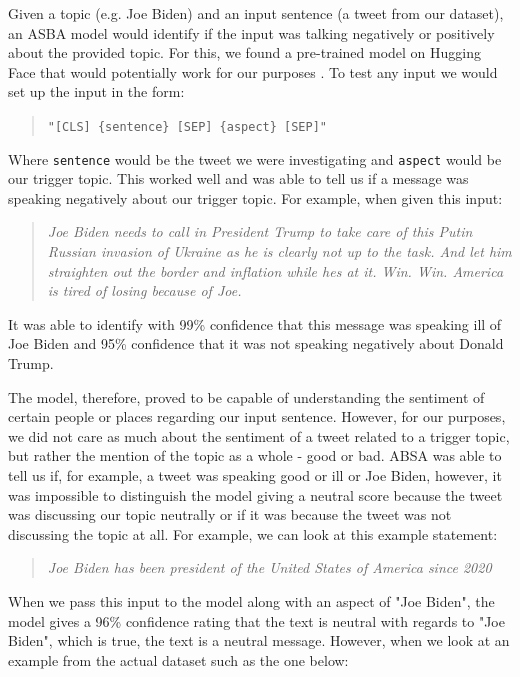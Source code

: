 Given a topic (e.g. Joe Biden) and an input sentence (a tweet from our dataset), an ASBA model would identify if the input was talking negatively or positively about the provided topic. For this, we found a pre-trained model on Hugging Face that would potentially work for our purposes \cite{ABSA}. To test any input we would set up the input in the form:
\begin{quote}
    \verb|"[CLS] {sentence} [SEP] {aspect} [SEP]"|
\end{quote}
Where \verb|sentence| would be the tweet we were investigating and \verb|aspect| would be our trigger topic. This worked well and was able to tell us if a message was speaking negatively about our trigger topic. For example, when given this input:
\begin{quote}
    \textit{Joe Biden needs to call in President Trump to take care of this Putin Russian invasion of Ukraine as he is clearly not up to the task. And let him straighten out the border and inflation while hes at it. Win. Win. America is tired of losing because of Joe.}
\end{quote}
It was able to identify with 99\% confidence that this message was speaking ill of Joe Biden and 95\% confidence that it was not speaking negatively about Donald Trump.

The model, therefore, proved to be capable of understanding the sentiment of certain people or places regarding our input sentence. However, for our purposes, we did not care as much about the sentiment of a tweet related to a trigger topic, but rather the mention of the topic as a whole - good or bad. ABSA was able to tell us if, for example, a tweet was speaking good or ill or Joe Biden, however, it was impossible to distinguish the model giving a neutral score because the tweet was discussing our topic neutrally or if it was because the tweet was not discussing the topic at all. For example, we can look at this example statement:

\begin{quote}
    \textit{Joe Biden has been president of the United States of America since 2020}
\end{quote}

When we pass this input to the model along with an aspect of "Joe Biden", the model gives a 96\% confidence rating that the text is neutral with regards to "Joe Biden", which is true, the text is a neutral message. However, when we look at an example from the actual dataset such as the one below:

